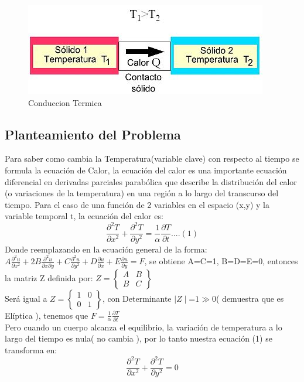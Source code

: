 \documentclass[11pt,a4paper]{article}
\begin{document}
\begin{figure}[htbp]
\begin{center}
\includegraphics[scale=1.25]{img_2}
\caption{Conduccion Termica}
\label{figura2}
\end{center}
\end{figure}


\subsection{Planteamiento del Problema}
\thispagestyle{empty}
Para saber como cambia la Temperatura(variable clave) con respecto al tiempo se formula la ecuación de Calor, la ecuación del calor es una importante ecuación diferencial en derivadas parciales parabólica que describe la distribución del calor (o variaciones de la temperatura) en una región a lo largo del transcurso del tiempo. Para el caso de una función de 2 variables en el espacio (x,y) y la variable temporal t, la ecuación del calor es:
$$
\frac{\partial^2 T}{\partial x^2} + \frac{\partial^2 T}{\partial y^2} = \frac{1}{\alpha} \frac{\partial T}{\partial t} ....(1)
$$
Donde reemplazando en la ecuación general de la forma: $
A\frac{\partial^2u}{\partial x^2} + 2B\frac{\partial^2u}{\partial x \partial y}+ C\frac{\partial^2u}{\partial y^2} +D\frac{\partial u}{\partial x}+E\frac{\partial u}{\partial y}= F
$, se obtiene A=C=1, B=D=E=0, entonces la matriz Z definida por:
$
Z=\left\{\begin{array}{crl}
    A & B\\
    B & C
    \end{array}\right\}
$
\\Será igual a $
Z=\left\{\begin{array}{crl}
    1 & 0\\
    0 & 1
    \end{array}\right\}
$, con Determinante $\mid Z\mid$=$1 \gg 0 $( demuestra que es Elíptica ), tenemos que $ F = \frac{1}{\alpha} \frac{\partial T}{\partial t} $\\ Pero cuando un cuerpo alcanza el equilibrio, la variación de temperatura a lo largo del tiempo es nula( no cambia ), por lo tanto nuestra ecuación (1) se transforma en:
$$
\frac{\partial^2 T}{\partial x^2} + \frac{\partial^2 T}{\partial y^2} = 0
$$
\end{document}
